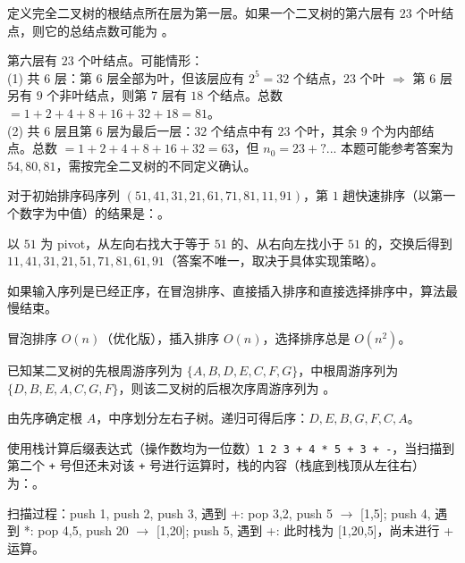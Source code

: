 \begin{question}
定义完全二叉树的根结点所在层为第一层。如果一个二叉树的第六层有 $23$ 个叶结点，则它的总结点数可能为 \underline{\hspace{4em}}。
\begin{solution}
第六层有 $23$ 个叶结点。可能情形：\\
(1) 共 6 层：第 6 层全部为叶，但该层应有 $2^{5}=32$ 个结点，$23$ 个叶 $\Rightarrow$ 第 6 层另有 $9$ 个非叶结点，则第 7 层有 $18$ 个结点。总数 $=1+2+4+8+16+32+18=81$。\\
(2) 共 6 层且第 6 层为最后一层：$32$ 个结点中有 $23$ 个叶，其余 $9$ 个为内部结点。总数 $=1+2+4+8+16+32=63$，但 $n_0=23+?$... 本题可能参考答案为 $54,80,81$，需按完全二叉树的不同定义确认。
\end{solution}
\end{question}

\begin{question}
对于初始排序码序列 $(51,41,31,21,61,71,81,11,91)$，第 $1$ 趟快速排序（以第一个数字为中值）的结果是：\underline{\hspace{4em}}。
\begin{solution}
以 $51$ 为 pivot，从左向右找大于等于 $51$ 的、从右向左找小于 $51$ 的，交换后得到 $11,41,31,21,51,71,81,61,91$（答案不唯一，取决于具体实现策略）。
\end{solution}
\end{question}

\begin{question}
如果输入序列是已经正序，在冒泡排序、直接插入排序和直接选择排序中，\underline{\hspace{4em}}算法最慢结束。
\begin{solution}
冒泡排序 $O(n)$（优化版），插入排序 $O(n)$，选择排序总是 $O(n^2)$。
\end{solution}
\end{question}

\begin{question}
已知某二叉树的先根周游序列为 $\{A,B,D,E,C,F,G\}$，中根周游序列为 $\{D,B,E,A,C,G,F\}$，则该二叉树的后根次序周游序列为 \underline{\hspace{4em}}。
\begin{solution}
由先序确定根 $A$，中序划分左右子树。递归可得后序：$D,E,B,G,F,C,A$。
\end{solution}
\end{question}

\begin{question}
使用栈计算后缀表达式（操作数均为一位数）\texttt{1 2 3 + 4 * 5 + 3 + -}，当扫描到第二个 \texttt{+} 号但还未对该 \texttt{+} 号进行运算时，栈的内容（栈底到栈顶从左往右）为：\underline{\hspace{4em}}。
\begin{solution}
扫描过程：push 1, push 2, push 3, 遇到 +: pop 3,2, push 5 $\to$ [1,5]; push 4, 遇到 *: pop 4,5, push 20 $\to$ [1,20]; push 5, 遇到 +: 此时栈为 [1,20,5]，尚未进行 + 运算。
\end{solution}
\end{question}

